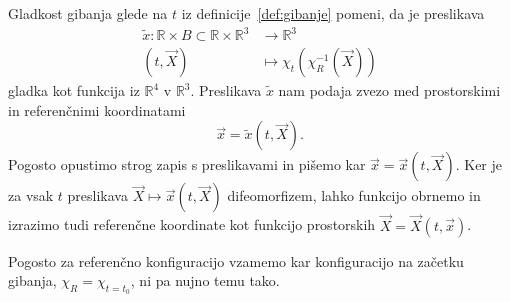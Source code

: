 \documentclass[a4paper,twoside]{article}
\theoremstyle{definition} %
\theoremstyle{plain} %
\numberwithin{equation}{section}
\newcommand{\R}{\mathbb R}
\newcommand{\vX}{\vec{X}}
\newcommand{\vx}{\vec{x}}
\begin{document}
Gladkost gibanja glede na $t$ iz definicije~\ref{def:gibanje} pomeni, da je
preslikava
\begin{align*}
  \tilde{x}\colon \R \times B \subset \R \times \R^3&\to \R^3 \\
  (t, \vX) &\mapsto \chi_t(\chi_R^{-1}(\vX))
\end{align*}
gladka kot funkcija iz $\R^4$ v $\R^3$.
Preslikava $\tilde x$ nam podaja zvezo med prostorskimi in referenčnimi
koordinatami
\[
  \vx = \tilde x(t, \vX).
\]
Pogosto opustimo strog zapis s preslikavami in pišemo kar $\vx = \vx(t, \vX)$.
Ker je za vsak $t$ preslikava $\vX \mapsto \vx(t, \vX)$ difeomorfizem, lahko funkcijo
obrnemo in izrazimo tudi referenčne koordinate kot funkcijo prostorskih $\vX = \vX(t, \vx)$.

Pogosto za referenčno konfiguracijo vzamemo kar konfiguracijo na začetku
gibanja, $\chi_R = \chi_{t=t_0}$, ni pa nujno temu tako.
\end{document}
